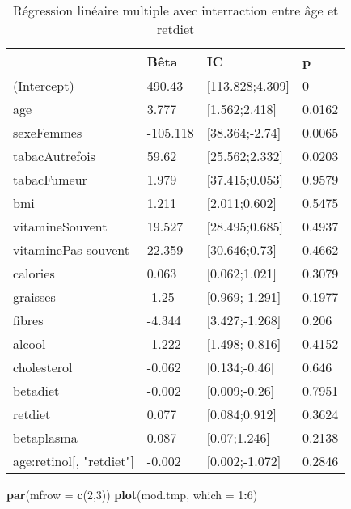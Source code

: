 \documentclass[]{article}
\newenvironment{Shaded}{\begin{snugshade}}{\end{snugshade}}
\newcommand{\KeywordTok}[1]{\textcolor[rgb]{0.13,0.29,0.53}{\textbf{#1}}}
\newcommand{\DataTypeTok}[1]{\textcolor[rgb]{0.13,0.29,0.53}{#1}}
\newcommand{\DecValTok}[1]{\textcolor[rgb]{0.00,0.00,0.81}{#1}}
\newcommand{\OperatorTok}[1]{\textcolor[rgb]{0.81,0.36,0.00}{\textbf{#1}}}
\newcommand{\NormalTok}[1]{#1}
\begin{document}
\begin{table}

\caption{\label{tab:unnamed-chunk-58}Régression linéaire multiple avec interraction entre âge et retdiet}
\centering
\begin{tabular}[t]{l|l|l|l}
\hline
  & Bêta & IC & p\\
\hline
\rowcolor[HTML]{BBD2E1}  (Intercept) & 490.43 & [113.828;4.309] & 0\\
\hline
age & 3.777 & [1.562;2.418] & 0.0162\\
\hline
\rowcolor[HTML]{BBD2E1}  sexeFemmes & -105.118 & [38.364;-2.74] & 0.0065\\
\hline
tabacAutrefois & 59.62 & [25.562;2.332] & 0.0203\\
\hline
\rowcolor[HTML]{BBD2E1}  tabacFumeur & 1.979 & [37.415;0.053] & 0.9579\\
\hline
bmi & 1.211 & [2.011;0.602] & 0.5475\\
\hline
\rowcolor[HTML]{BBD2E1}  vitamineSouvent & 19.527 & [28.495;0.685] & 0.4937\\
\hline
vitaminePas-souvent & 22.359 & [30.646;0.73] & 0.4662\\
\hline
\rowcolor[HTML]{BBD2E1}  calories & 0.063 & [0.062;1.021] & 0.3079\\
\hline
graisses & -1.25 & [0.969;-1.291] & 0.1977\\
\hline
\rowcolor[HTML]{BBD2E1}  fibres & -4.344 & [3.427;-1.268] & 0.206\\
\hline
alcool & -1.222 & [1.498;-0.816] & 0.4152\\
\hline
\rowcolor[HTML]{BBD2E1}  cholesterol & -0.062 & [0.134;-0.46] & 0.646\\
\hline
betadiet & -0.002 & [0.009;-0.26] & 0.7951\\
\hline
\rowcolor[HTML]{BBD2E1}  retdiet & 0.077 & [0.084;0.912] & 0.3624\\
\hline
betaplasma & 0.087 & [0.07;1.246] & 0.2138\\
\hline
\rowcolor[HTML]{BBD2E1}  age:retinol[, "retdiet"] & -0.002 & [0.002;-1.072] & 0.2846\\
\hline
\end{tabular}
\end{table}

\begin{Shaded}
\begin{Highlighting}[]
\KeywordTok{par}\NormalTok{(}\DataTypeTok{mfrow =} \KeywordTok{c}\NormalTok{(}\DecValTok{2}\NormalTok{,}\DecValTok{3}\NormalTok{))}
\KeywordTok{plot}\NormalTok{(mod.tmp, }\DataTypeTok{which =} \DecValTok{1}\OperatorTok{:}\DecValTok{6}\NormalTok{)}
\end{Highlighting}
\end{Shaded}
\end{document}
